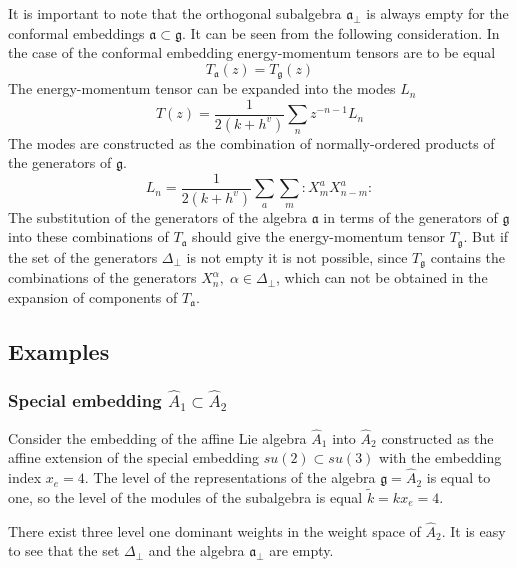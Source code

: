 \documentclass[a4paper,12pt]{article}
\theoremstyle{definition} \newtheorem{Def}{Definition}
\begin{document}
It is important to note that the orthogonal subalgebra $\mathfrak{a}_{\bot}$ is always empty for the conformal embeddings $\mathfrak{a}\subset \mathfrak{g}$. It can be seen from the following consideration. In the case of the conformal embedding energy-momentum tensors are to be equal
\begin{equation}
  \label{eq:46}
  T_{\mathfrak{a}}(z)=T_{\mathfrak{g}}(z)
\end{equation}
The energy-momentum tensor can be expanded into the modes $L_n$
\begin{equation}
\label{eq:47}
  T(z)=\frac{1}{2(k+h^v)}\sum_n z^{-n-1}L_n
\end{equation}
The modes are constructed as the combination of normally-ordered products of the generators of $\mathfrak{g}$.
\begin{equation}
\label{eq:48}
  L_n=\frac{1}{2(k+h^v)}\sum_a\sum_m:X^a_m X^a_{n-m}:
\end{equation}
The substitution of the generators of the algebra $\mathfrak{a}$  in terms of the generators of $\mathfrak{g}$ into these combinations of $T_{\mathfrak{a}}$ should give the energy-momentum tensor $T_{\mathfrak{g}}$. But if the set of the generators $\Delta_{\bot}$ is not empty it is not possible, since $T_{\mathfrak{g}}$ contains the combinations of the generators $X^{\alpha}_n, \; \alpha\in \Delta_{\bot}$, which can not be obtained in the expansion of components of $T_{\mathfrak{a}}$.

\subsection{Examples}
\label{sec:example}

\subsubsection{Special embedding $\hat{A}_1\subset\hat{A}_2$}
\label{sec:spec-embedd-hata_1s}
Consider the embedding of the affine Lie algebra $\hat{A}_1$ into $\hat{A}_2$ constructed as the affine extension of the special embedding $su(2)\subset su(3)$ with the embedding index $x_e=4$. The level of the representations of the algebra $\mathfrak{g}=\hat{A}_2$ is equal to one, so the level of the modules of the subalgebra is equal $\tilde{k}=kx_e=4$.

There exist three level one dominant weights in the weight space of $\hat{A}_2$.
It is easy to see that the set $\Delta_{\bot}$ and the algebra $\mathfrak{a}_{\bot}$ are empty.
\end{document}
